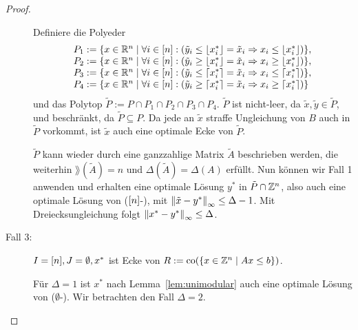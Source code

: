 \begin{proof}
\begin{description}
		Definiere die Polyeder
		$$
		\begin{array}{l}
		P_1:= \{ x\in\mathbb{R}^n \mid \forall i\in[n]: (\tilde{y}_i\leq \left\lfloor x^*_i \right\rfloor = \tilde{x}_i \Rightarrow x_i \leq \left\lfloor x^*_i \right\rfloor)\},\\
		P_2:= \{ x\in\mathbb{R}^n \mid \forall i\in[n]: (\tilde{y}_i\geq \left\lfloor x^*_i \right\rfloor = \tilde{x}_i \Rightarrow x_i \geq \left\lfloor x^*_i \right\rfloor)\}, \\
		P_3:= \{ x\in\mathbb{R}^n \mid \forall i\in[n]: (\tilde{y}_i\leq \left\lceil x^*_i \right\rceil = \tilde{x}_i \Rightarrow x_i \leq \left\lceil x^*_i \right\rceil)\},\\
		P_4:= \{ x\in\mathbb{R}^n \mid \forall i\in[n]: (\tilde{y}_i\geq \left\lceil x^*_i \right\rceil = \tilde{x}_i \Rightarrow x_i \geq \left\lceil x^*_i \right\rceil)\}
		\end{array}
		$$
		und das Polytop $\tilde{P}:=P\cap P_1 \cap P_2 \cap P_3 \cap P_4$.
		$\tilde{P}$ ist nicht-leer, da $\tilde{x}, \tilde{y}\in\tilde{P}$, und beschränkt, da $\tilde{P}\subseteq P$.
		Da jede an $\tilde{x}$ straffe Ungleichung von $B$ auch in $\tilde{P}$ vorkommt, ist $\tilde{x}$ auch eine optimale Ecke von $\tilde{P}$.
		
		$\tilde{P}$ kann wieder durch eine ganzzahlige Matrix $\tilde{A}$ beschrieben werden, die weiterhin $\rang(\tilde{A})=n$ und $\Delta(\tilde{A})=\Delta(A)$ erfüllt.
		Nun können wir Fall 1 anwenden und erhalten eine optimale Lösung $y^*$ in $\tilde{P}\cap\mathbb{Z}^n$, also auch eine optimale Lösung von ($[n]$-\MIPI), mit $\left\lVert\tilde{x} -y^*\right\rVert_\infty\leq \Delta -1$.
		Mit Dreiecksungleichung folgt $\left\lVert x^* - y^*\right\rVert_\infty\leq \Delta$.
		
		\item[Fall 3:] $I=[n],J=\emptyset,x^*$ ist Ecke von $R:=\operatorname{co}(\{ x\in\mathbb{Z}^n \mid Ax\leq b \})$.
		
		Für $\Delta=1$ ist $x^*$ nach Lemma~\ref{lem:unimodular} auch eine optimale Lösung von ($\emptyset$-\MIPI).
		Wir betrachten den Fall $\Delta=2$.
		
	\end{description}
\end{proof}